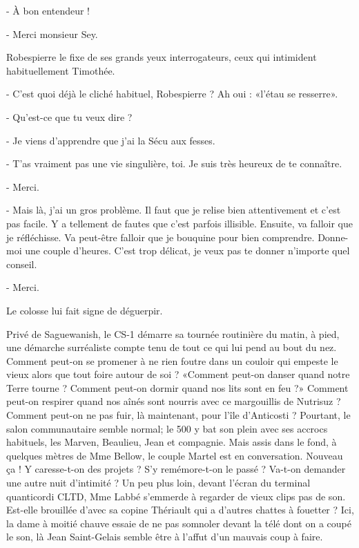 - À bon entendeur !

- Merci monsieur Sey.

Robespierre le fixe de ses grands yeux interrogateurs, ceux qui intimident habituellement Timothée.

- C’est quoi déjà le cliché habituel, Robespierre ? Ah oui : «l’étau se resserre».

- Qu’est-ce que tu veux dire ?

- Je viens d’apprendre que j’ai la Sécu aux fesses.

- T’as vraiment pas une vie singulière, toi. Je suis très heureux de te connaître.

- Merci.

- Mais là, j’ai un gros problème. Il faut que je relise bien attentivement et c’est pas facile. Y a tellement de fautes que c’est parfois illisible. Ensuite, va falloir que je réfléchisse. Va peut-être falloir que je bouquine pour bien comprendre. Donne-moi une couple d’heures. C’est trop délicat, je veux pas te donner n’importe quel conseil.

- Merci.

Le colosse lui fait signe de déguerpir.

Privé de Saguewanish, le CS-1 démarre sa tournée routinière du matin, à pied, une démarche surréaliste compte tenu de tout ce qui lui pend au bout du nez. Comment peut-on se promener à ne rien foutre dans un couloir qui empeste le vieux alors que tout foire autour de soi ? «Comment peut-on danser quand notre Terre tourne ? Comment peut-on dormir quand nos lits sont en feu ?» Comment peut-on respirer quand nos aînés sont nourris avec ce margouillis de Nutrisuz ? Comment peut-on ne pas fuir, là maintenant, pour l’île d’Anticosti ? Pourtant, le salon communautaire semble normal; le 500 y bat son plein avec ses accrocs habituels, les Marven, Beaulieu, Jean et compagnie. Mais assis dans le fond, à quelques mètres de Mme Bellow, le couple Martel est en conversation. Nouveau ça ! Y caresse-t-on des projets ? S’y remémore-t-on le passé ? Va-t-on demander une autre nuit d’intimité ? Un peu plus loin, devant l’écran du terminal quanticordi CLTD, Mme Labbé s’emmerde à regarder de vieux clips pas de son. Est-elle brouillée d’avec sa copine Thériault qui a d’autres chattes à fouetter ? Ici, la dame à moitié chauve essaie de ne pas somnoler devant la télé dont on a coupé le son, là Jean Saint-Gelais semble être à l’affut d’un mauvais coup à faire.

